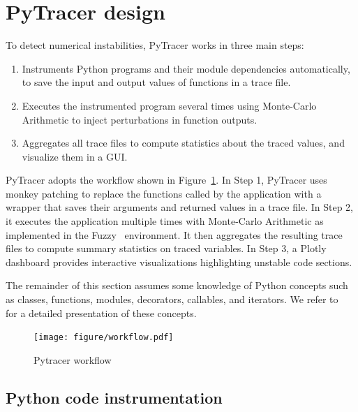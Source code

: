 \documentclass[10pt,journal,compsoc]{IEEEtran}
\newcommand{\pytracer}[0]{PyTracer\xspace}
\DeclareRobustCommand{\add}[1]{\textcolor{ao(english)}{#1}}%
\DeclareRobustCommand{\add}[1]{#1}
\begin{document}
\section{\pytracer design}

To detect numerical instabilities, \pytracer works in three main steps:
\begin{enumerate}
    \item Instruments Python programs and their module dependencies
          automatically, to save the input and output values of functions in a trace
          file.
    \item Executes the instrumented program several times using Monte-Carlo
          Arithmetic to inject perturbations in function outputs.
    \item Aggregates all trace files to compute statistics about the traced
          values, and visualize them in a GUI.
\end{enumerate}
\pytracer adopts the workflow shown in Figure~\ref{fig:workflow}.
In \add{S}tep 1, \pytracer uses monkey patching to replace the functions called
by the application with a wrapper that saves their arguments and returned
values in a trace file. In \add{S}tep 2, it executes the application multiple
times with Monte-Carlo Arithmetic as implemented in the
Fuzzy~\cite{kiar2020comparing} environment. It then
aggregates the resulting trace files to compute summary statistics on
traced variables. In \add{S}tep 3, a Plotly dashboard provides interactive
visualizations highlighting unstable code sections.

The remainder of this section assumes some knowledge of Python concepts
such as classes, functions, modules, decorators, callables, and iterators.
We refer to~\cite{beazley2013python} for a detailed presentation of these
concepts.

\begin{figure}
    \centering
    \texttt{[image: figure/workflow.pdf]}
    \caption{Pytracer workflow
    }
    \label{fig:workflow}
\end{figure}

\subsection{Python code instrumentation}

\end{document}

